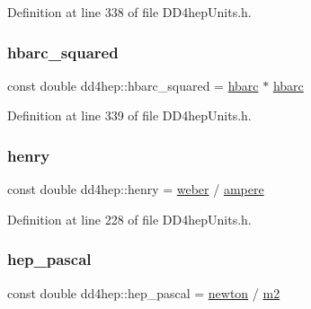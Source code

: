 Definition at line 338 of file D\+D4hep\+Units.\+h.

\hypertarget{namespacedd4hep_acf9f3f7006e079db9d63413e8c861d94}{}\label{namespacedd4hep_acf9f3f7006e079db9d63413e8c861d94} 
\subsubsection{\texorpdfstring{hbarc\+\_\+squared}{hbarc\_squared}}
{\footnotesize\ttfamily const double dd4hep\+::hbarc\+\_\+squared = \hyperlink{namespacedd4hep_aee6340c5f86bb7ae1edcc2a90efa056e}{hbarc} $\ast$ \hyperlink{namespacedd4hep_aee6340c5f86bb7ae1edcc2a90efa056e}{hbarc}\hspace{0.3cm}{\ttfamily [static]}}



Definition at line 339 of file D\+D4hep\+Units.\+h.

\hypertarget{namespacedd4hep_adc130a4b9874431a4fb19fa27220372c}{}\label{namespacedd4hep_adc130a4b9874431a4fb19fa27220372c} 
\subsubsection{\texorpdfstring{henry}{henry}}
{\footnotesize\ttfamily const double dd4hep\+::henry = \hyperlink{namespacedd4hep_abf1c21ae96759cd276d59ddde4819838}{weber} / \hyperlink{namespacedd4hep_a1342ab2280c2fed87fe4beaebae8cf52}{ampere}\hspace{0.3cm}{\ttfamily [static]}}



Definition at line 228 of file D\+D4hep\+Units.\+h.

\hypertarget{namespacedd4hep_ad7dfeb546cf76cb6959665edbfd320bb}{}\label{namespacedd4hep_ad7dfeb546cf76cb6959665edbfd320bb} 
\subsubsection{\texorpdfstring{hep\+\_\+pascal}{hep\_pascal}}
{\footnotesize\ttfamily const double dd4hep\+::hep\+\_\+pascal = \hyperlink{namespacedd4hep_a07c189d8b327db9b4ae12f3def589851}{newton} / \hyperlink{namespacedd4hep_aea4ab60384218f15ec3ba53896735b6c}{m2}\hspace{0.3cm}{\ttfamily [static]}}



